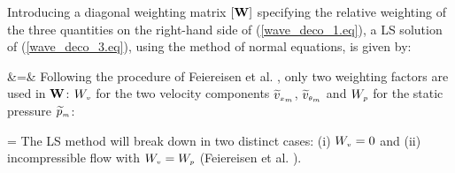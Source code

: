 { Introducing a diagonal weighting matrix $\left[{\bf W}\right]$ specifying
 the relative weighting of the three quantities on the right-hand side
 of (\ref{wave_deco_1.eq}), a LS solution of (\ref{wave_deco_3.eq}),
 using the method of normal equations, is given by:

%
\beq
 \left[{\bf T}\right]\left[{\bf W}\right] &=&
 \left[{\bf T}\right]
 \label{wave_deco_4.eq}
\eeq
%
 Following the procedure of Feiereisen et al. \citeyear{Feiereisen:1},
 only two weighting factors are used in ${\bf W}$: $W_{\mbox{\tiny $v$}}$ for the two velocity
 components $\widetilde{v}_{\mbox{\tiny $x_m$}}$, $\widetilde{v}_{\mbox{\tiny $\theta_m$}}$ and $W_{\mbox{\tiny $p$}}$ for the
 static pressure $\widetilde{p}_{\mbox{\tiny $m$}}$:

%
\beq
  \left[{\bf W}\right] = 
\eeq
%
 The LS method will break down in two distinct cases: (i) $W_{\mbox{\tiny $v$}} = 0$ and
 (ii) incompressible flow with $W_{\mbox{\tiny $v$}} = W_{\mbox{\tiny $p$}}$
 (Feiereisen et al. ).
%
%
%
}

